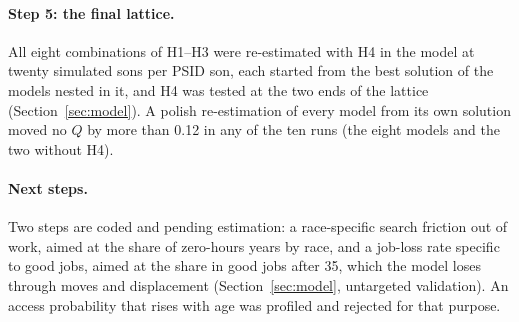 \paragraph{Step 5: the final lattice.} All eight combinations of H1--H3 were re-estimated with H4 in the model at
twenty simulated sons per PSID son, each started from the best solution of the models nested in it, and H4 was tested
at the two ends of the lattice (Section~\ref{sec:model}). A polish re-estimation of every model from its own solution
moved no $Q$ by more than 0.12 in any of the ten runs (the eight models and the two without H4).

\paragraph{Next steps.} Two steps are coded and pending estimation: a race-specific search friction out of work,
aimed at the share of zero-hours years by race, and a job-loss rate specific to good jobs, aimed at the share in good jobs
after 35, which the model loses through moves and displacement (Section~\ref{sec:model}, untargeted validation). An
access probability that rises with age was profiled and rejected for that purpose.
